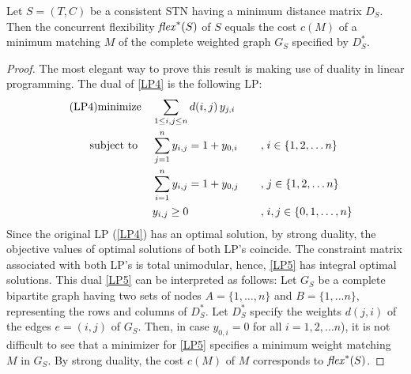\begin{proposition}
Let $S = (T,C)$ be a consistent STN having a minimum distance matrix $D_S$. Then the concurrent flexibility $\mathit{flex}^*(S)$ of $S$ equals the cost $c(M)$ of a minimum matching $M$ of the complete weighted graph $G_S$ specified by $D^*_S$.
\end{proposition}
\begin{proof}
The most elegant way to prove this result is making use of duality in linear programming.
The dual of \ref{LP4} is the following LP:
\begin{alignat*}{2}
\label{LP5} 
\tag{LP4}
\text{minimize}                       &\quad \sum_{1 \leq i,j \leq n} d(i,j) \, y_{j,i} \\
\text{subject to }  &\quad  \sum^n_{j=1} y_{i,j} = 1  + y_{0,i} \quad                &, &\; i \in \{1,2,\ldots n\} \notag \\
                           &\quad  \sum^n_{i=1} y_{i,j}               = 1  + y_{0,j} \quad &, &\; j \in \{1,2,\ldots n\} \notag \\
                           &\quad  y_{i,j} \geq 0 \quad & , &\; i,j \in \{0,1,\ldots, n \} \notag
\end{alignat*}
Since the original LP (\ref{LP4}) has an optimal solution, by strong duality, the objective values of optimal solutions of both LP's coincide. 
The constraint matrix associated with both LP's is total unimodular, hence, \ref{LP5} has integral optimal solutions.
This dual \ref{LP5} can be interpreted as follows: 
Let $G_S$ be a complete bipartite graph having two sets of nodes  $A = \{1, \ldots, n \}$ and $B = \{1, \ldots n \}$, representing the rows and columns of $D^*_S$. Let $D^*_S$ specify the weights $d(j,i)$ of the edges $e=(i,j)$ of $G_S$.
Then, in case $y_{0,i} = 0$ for all $i=1,2, \ldots n$), it is not difficult to see that a minimizer for \ref{LP5} specifies a minimum weight matching $M$ in $G_S$.
By strong duality, the cost $c(M)$ of $M$ corresponds to  $\mathit{flex}^*(S)$.
 

\end{proof}
